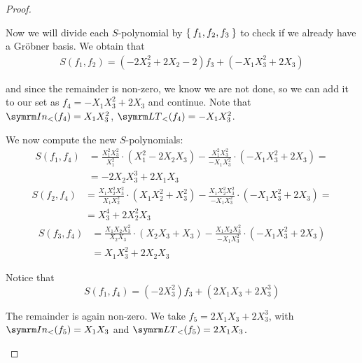 \begin{proof}
\begin{itemize}
    Now we will divide each \(S\)-polynomial by \(\Set{ f_1, f_2, f_3 }\) to check if we already have a Gröbner basis. We obtain that
    \begin{align*}
        S(f_1, f_2) = (- 2 X_2^2 + 2 X_2 - 2) f_3 + (- X_1 X_3^2 + 2 X_3)
    \end{align*}
    
    and since the remainder is non-zero, we know we are not done, so we can add it to our set as \(f_4 = - X_1 X_3^2 + 2 X_3\) and continue. Note that \(\In(f_4) = X_1 X_3^2\), \(\LT(f_4) = - X_1 X_3^2\).
    
    We now compute the new \(S\)-polynomials:
    \begin{align*}
        S(f_1, f_4) &= \frac{X_1^2 X_3^2}{X_1^2} \cdot (X_1^2 - 2 X_2 X_3) - \frac{X_1^2 X_3^2}{- X_1 X_3^2} \cdot (- X_1 X_3^2 + 2 X_3) = \\
        &= - 2 X_2 X_3^3 + 2 X_1 X_3
    \end{align*}
    \begin{align*}
        S(f_2, f_4) &= \frac{X_1 X_2^2 X_3^2}{X_1 X_2^2} \cdot (X_1 X_2^2 + X_3^2) - \frac{X_1 X_2^2 X_3^2}{- X_1 X_3^2} \cdot (- X_1 X_3^2 + 2 X_3) = \\
        &= X_3^4 + 2 X_2^2 X_3
    \end{align*}
    \begin{align*}
        S(f_3, f_4) &= \frac{X_1 X_2 X_3^2}{X_2 X_3} \cdot (X_2 X_3 + X_3) - \frac{X_1 X_2 X_3^2}{- X_1 X_3^2} \cdot (- X_1 X_3^2 + 2 X_3) \\
        &= X_1 X_3^2 + 2 X_2 X_3
    \end{align*}
    
    Notice that
    \[
        S(f_1, f_4) = (-2 X_3^2) f_3 + (2 X_1 X_3 + 2 X_3^3)
    \]
    
    The remainder is again non-zero. We take \(f_5 = 2 X_1 X_3 + 2 X_3^3\), with \(\In(f_5) = X_1 X_3\) and \(\LT(f_5) = 2 X_1 X_3\).
    

\end{itemize}
\end{proof}
